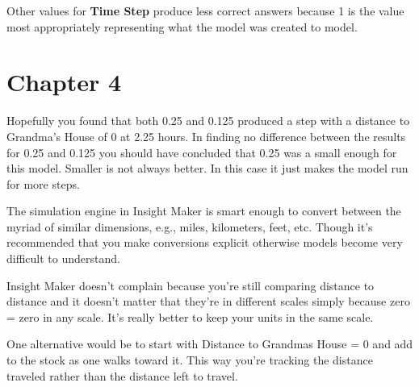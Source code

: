 \documentclass[]{memoir}
\renewcommand{\u}[1]{\textbf{#1}}
\begin{document}

Other values for \u{Time Step} produce less correct answers because 1 is
the value most appropriately representing what the model was created to
model.

\section{Chapter 4}


Hopefully you found that both 0.25 and 0.125 produced a step with a
distance to Grandma's House of 0 at 2.25 hours. In finding no difference
between the results for 0.25 and 0.125 you should have concluded that
0.25 was a small enough for this model. Smaller is not always better. In
this case it just makes the model run for more steps.


The simulation engine in Insight Maker is smart enough to convert
between the myriad of similar dimensions, e.g., miles, kilometers, feet,
etc. Though it's recommended that you make conversions explicit
otherwise models become very difficult to understand.

Insight Maker doesn't complain because you're still comparing distance
to distance and it doesn't matter that they're in different scales
simply because zero = zero in any scale. It's really better to keep your
units in the same scale.


One alternative would be to start with Distance to Grandmas House = 0
and add to the stock as one walks toward it. This way you're tracking
the distance traveled rather than the distance left to travel.
\end{document}
